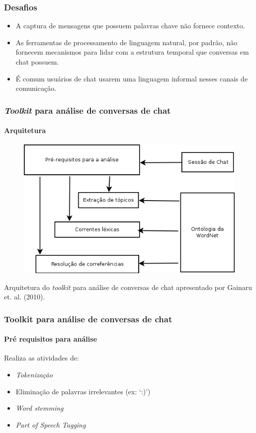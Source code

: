 \documentclass{beamer}
\begin{document}

\begin{frame}
\frametitle{Desafios}

\begin{itemize}
    \setlength\itemsep{1.5em}
    \item A captura de mensagens que possuem palavras chave não fornece
    contexto.
    \item As ferramentas de processamento de linguagem natural, por padrão,
    não fornecem mecanismos para lidar com a estrutura temporal que conversas
    em chat possuem.
    \item É comum usuários de chat usarem uma linguagem informal nesses canais
    de comunicação.
\end{itemize}

\end{frame}


\begin{frame}
\frametitle{\textit{Toolkit} para análise de conversas de chat}
\framesubtitle{Arquitetura}

\begin{figure}
\includegraphics[width=0.6\linewidth]{gainaru_architecture.png}
\end{figure}

Arquitetura do \textit{toolkit} para análise de conversas de chat apresentado
por Gainaru et. al. (2010).

\end{frame}


\begin{frame}
\frametitle{Toolkit para análise de conversas de chat}
\framesubtitle{Pré requisitos para análise}

Realiza as atividades de:
\begin{itemize}
  \setlength\itemsep{0.8em}
  \item{\textit{Tokenização}}
  \item{Eliminação de palavras irrelevantes} (ex: `:)')
  \item{\textit{Word stemming}}
  \item{\textit{Part of Speech Tagging}}
\end{itemize}
\end{frame}
\end{document}
